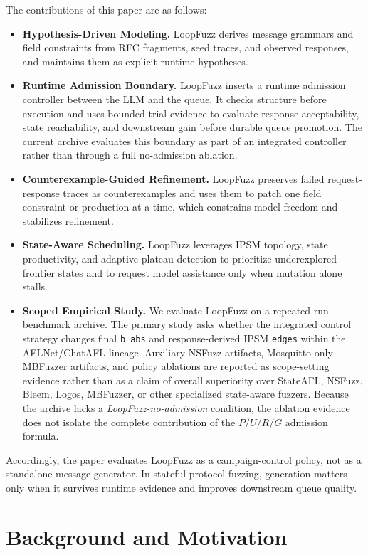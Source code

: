 \documentclass[final,5p,times,number]{elsarticle}
\begin{document}
The contributions of this paper are as follows:
\begin{itemize}
    \item \textbf{Hypothesis-Driven Modeling.} LoopFuzz derives message grammars and field constraints from RFC fragments, seed traces, and observed responses, and maintains them as explicit runtime hypotheses.
    \item \textbf{Runtime Admission Boundary.} LoopFuzz inserts a runtime admission controller between the LLM and the queue. It checks structure before execution and uses bounded trial evidence to evaluate response acceptability, state reachability, and downstream gain before durable queue promotion. The current archive evaluates this boundary as part of an integrated controller rather than through a full no-admission ablation.
    \item \textbf{Counterexample-Guided Refinement.} LoopFuzz preserves failed request-response traces as counterexamples and uses them to patch one field constraint or production at a time, which constrains model freedom and stabilizes refinement.
    \item \textbf{State-Aware Scheduling.} LoopFuzz leverages IPSM topology, state productivity, and adaptive plateau detection to prioritize underexplored frontier states and to request model assistance only when mutation alone stalls.
    \item \textbf{Scoped Empirical Study.} We evaluate LoopFuzz on a repeated-run benchmark archive. The primary study asks whether the integrated control strategy changes final \texttt{b\_abs} and response-derived IPSM \texttt{edges} within the AFLNet/ChatAFL lineage. Auxiliary NSFuzz artifacts, Mosquitto-only MBFuzzer artifacts, and policy ablations are reported as scope-setting evidence rather than as a claim of overall superiority over StateAFL, NSFuzz, Bleem, Logos, MBFuzzer, or other specialized state-aware fuzzers. Because the archive lacks a \emph{LoopFuzz-no-admission} condition, the ablation evidence does not isolate the complete contribution of the $P/U/R/G$ admission formula.
\end{itemize}

Accordingly, the paper evaluates LoopFuzz as a campaign-control policy, not as a standalone message generator. In stateful protocol fuzzing, generation matters only when it survives runtime evidence and improves downstream queue quality.

\section{Background and Motivation}
\end{document}

